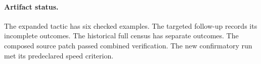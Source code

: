 \paragraph{Artifact status.} The expanded tactic has six checked examples. The targeted follow-up records its incomplete outcomes. The historical full census has separate outcomes. The composed source patch passed combined verification. The new confirmatory run met its predeclared speed criterion.
